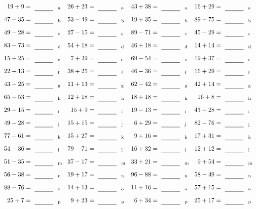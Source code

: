 \documentclass
[
  draft    = true,
  fontsize = 11pt,
  parskip  = half-
]
{scrartcl}
\begin{document}
\clearpage
\begin{align*}
    \pline{19+9}&=\rline{a}
  & \pline{26+23}&=\rline{a}
  & \pline{43+38}&=\rline{a}
  & \pline{16+29}&=\rline{a} \\[1ex]
    \pline{47-35}&=\rline{b}
  & \pline{53-49}&=\rline{b}
  & \pline{19+35}&=\rline{b}
  & \pline{89-75}&=\rline{b} \\[1ex]
    \pline{49-28}&=\rline{c}
  & \pline{27-15}&=\rline{c}
  & \pline{89-71}&=\rline{c}
  & \pline{45-29}&=\rline{c} \\[1ex]
    \pline{83-73}&=\rline{d}
  & \pline{54+18}&=\rline{d}
  & \pline{46+18}&=\rline{d}
  & \pline{14+14}&=\rline{d} \\[1ex]
    \pline{15+25}&=\rline{e}
  & \pline{7+29}&=\rline{e}
  & \pline{69-54}&=\rline{e}
  & \pline{19+37}&=\rline{e} \\[1ex]
    \pline{22+13}&=\rline{f}
  & \pline{38+25}&=\rline{f}
  & \pline{46-36}&=\rline{f}
  & \pline{16+29}&=\rline{f} \\[1ex]
    \pline{43-25}&=\rline{g}
  & \pline{11+13}&=\rline{g}
  & \pline{62-42}&=\rline{g}
  & \pline{42+14}&=\rline{g} \\[1ex]
    \pline{65-53}&=\rline{h}
  & \pline{12+18}&=\rline{h}
  & \pline{18+18}&=\rline{h}
  & \pline{16+8}&=\rline{h} \\[1ex]
    \pline{29-15}&=\rline{i}
  & \pline{15+9}&=\rline{i}
  & \pline{19-13}&=\rline{i}
  & \pline{43-28}&=\rline{i} \\[1ex]
    \pline{49-28}&=\rline{j}
  & \pline{15+15}&=\rline{j}
  & \pline{6+29}&=\rline{j}
  & \pline{82-76}&=\rline{j} \\[1ex]
    \pline{77-61}&=\rline{k}
  & \pline{15+27}&=\rline{k}
  & \pline{9+16}&=\rline{k}
  & \pline{17+31}&=\rline{k} \\[1ex]
    \pline{54-36}&=\rline{l}
  & \pline{79-71}&=\rline{l}
  & \pline{16+32}&=\rline{l}
  & \pline{12+12}&=\rline{l} \\[1ex]
    \pline{51-35}&=\rline{m}
  & \pline{37-17}&=\rline{m}
  & \pline{33+21}&=\rline{m}
  & \pline{9+54}&=\rline{m} \\[1ex]
    \pline{56-38}&=\rline{n}
  & \pline{19+17}&=\rline{n}
  & \pline{96-88}&=\rline{n}
  & \pline{58-49}&=\rline{n} \\[1ex]
    \pline{88-76}&=\rline{o}
  & \pline{14+13}&=\rline{o}
  & \pline{11+16}&=\rline{o}
  & \pline{57+15}&=\rline{o} \\[1ex]
    \pline{25+7}&=\rline{p}
  & \pline{9+23}&=\rline{p}
  & \pline{6+34}&=\rline{p}
  & \pline{25+17}&=\rline{p}
\end{align*}
\end{document}
